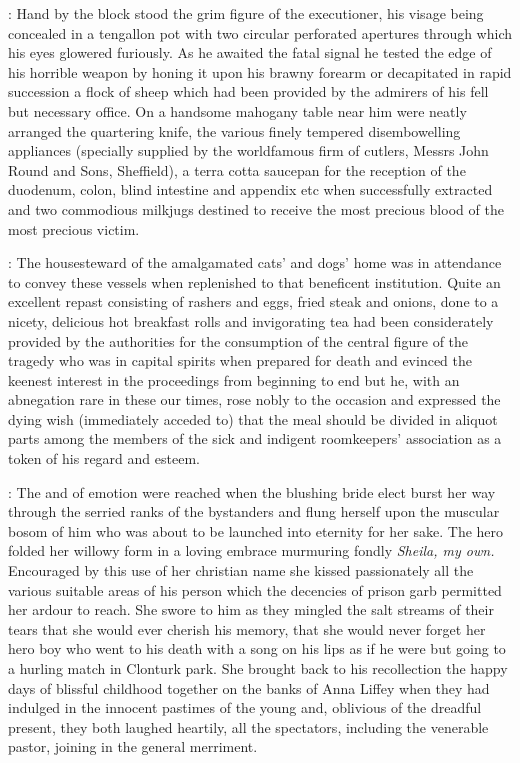 :
Hand by the block stood
the grim figure of the executioner,
his visage being concealed in a
tengallon pot with two circular perforated apertures through which
his eyes glowered furiously.
As he awaited the fatal signal he
tested the edge of his horrible weapon by honing it upon his
brawny forearm or decapitated in rapid succession a flock of
sheep which had been provided by the admirers of his fell but necessary
office.
On a handsome mahogany table near him were neatly arranged the
quartering knife,
the various finely tempered disembowelling appliances
(specially supplied by the worldfamous firm of cutlers,
Messrs John Round
and Sons,
Sheffield),
a terra cotta saucepan for the reception of the
duodenum,
colon,
blind intestine and appendix etc when successfully
extracted and two commodious milkjugs destined to receive the most
precious blood of the most precious victim.

:
The housesteward of the
amalgamated cats' and dogs' home was in attendance to convey these
vessels when replenished to that beneficent institution.
Quite an
excellent repast consisting of rashers and eggs,
fried steak and onions,
done to a nicety,
delicious hot breakfast rolls and invigorating tea had
been considerately provided by the authorities for the consumption
of the central figure of the tragedy
who was in capital spirits
when prepared for death and evinced the keenest interest in the
proceedings from beginning to end but he,
with an abnegation rare
in these our times,
rose nobly to the occasion and expressed the
dying wish (immediately acceded to) that the meal should be
divided in aliquot parts among the members of the sick and indigent
roomkeepers' association as a token of his regard and esteem.

:
The  and 
of emotion were reached when the blushing bride elect burst
her way through the serried ranks of the bystanders and flung herself upon
the muscular bosom of him who was about to be launched into eternity for
her sake.
The hero folded her willowy form in a loving embrace murmuring
fondly \emph{Sheila,
my own.}
Encouraged by this use of her christian name she
kissed passionately all the various suitable areas of his person which the
decencies of prison garb permitted her ardour to reach.
She swore to him
as they mingled the salt streams of their tears that she would ever
cherish his memory,
that she would never forget her hero boy who went to
his death with a song on his lips as if he were but going to a hurling
match in Clonturk park.
She brought back to his recollection the happy
days of blissful childhood together on the banks of Anna Liffey when they
had indulged in the innocent pastimes of the young and,
oblivious of the
dreadful present,
they both laughed heartily,
all the spectators,
including the venerable pastor,
joining in the general merriment.

